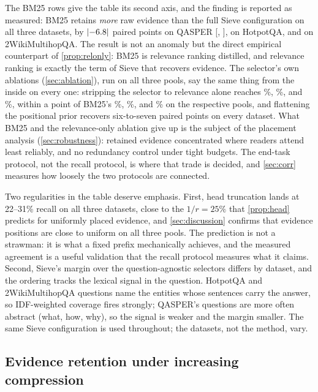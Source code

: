 \documentclass[preprint,12pt]{elsarticle}
\DeclarePairedDelimiter\abs{\lvert}{\rvert}
\theoremstyle{remark}
\newcommand{\method}{Sieve}
\begin{document}
The BM25 rows give the table its second axis, and the finding is
reported as measured: BM25 retains \emph{more} raw evidence than the
full \method{} configuration on all three datasets, by
$\abs{\PairQSBm}$ paired points on QASPER [\PairQSBmLo, \PairQSBmHi],
\PairHSBm{} on HotpotQA, and \PairWSBm{} on 2WikiMultihopQA. The
result is not an anomaly but the direct empirical counterpart of
\autoref{prop:relonly}: BM25 is relevance ranking distilled, and
relevance ranking is exactly the term of \method{} that recovers
evidence. The selector's own ablations (\autoref{sec:ablation}), run
on all three pools, say the same thing from the inside on every one:
stripping the selector to relevance alone reaches \AblXQRelOnly\%,
\AblXHRelOnly\%, and \AblXWRelOnly\%, within a point of BM25's
\RecQBm\%, \RecHBm\%, and \RecWBm\% on the respective pools, and
flattening the positional prior recovers six-to-seven paired points on
every dataset. What BM25 and the relevance-only ablation give up
is the subject of the placement analysis (\autoref{sec:robustness}):
retained evidence concentrated where readers attend least reliably,
and no redundancy control under tight budgets. The end-task protocol,
not the recall protocol, is where that trade is decided, and
\autoref{sec:corr} measures how loosely the two protocols are
connected.

Two regularities in the table deserve emphasis. First, head
truncation lands at 22--31\% recall on all three datasets, close to
the $1/r = 25\%$ that \autoref{prop:head} predicts for uniformly
placed evidence, and \autoref{sec:discussion} confirms that evidence
positions are close to uniform on all three pools. The prediction is
not a strawman: it is what a fixed prefix mechanically achieves, and
the measured agreement is a useful validation that the recall protocol
measures what it claims. Second, \method{}'s margin over the
question-agnostic selectors differs by dataset, and the ordering
tracks the lexical signal in the question. HotpotQA and
2WikiMultihopQA questions name the entities whose sentences carry the
answer, so IDF-weighted coverage fires strongly; QASPER's questions
are more often abstract (what, how, why), so the signal is weaker and
the margin smaller. The same \method{} configuration is used
throughout; the datasets, not the method, vary.

\subsection{Evidence retention under increasing compression}
\label{sec:ratio}
\end{document}
